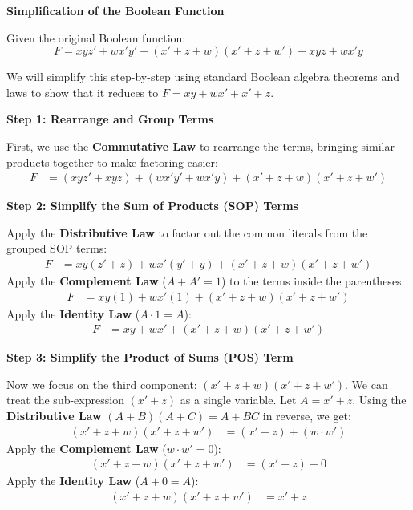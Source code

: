 \documentclass[12pt,a3paper]{article}
\begin{document}
\begin{enumerate}
\begin{tcolorbox}[enhanced,breakable,ansbox,colback=cA!4,colframe=cA,boxrule=0.8pt,arc=5pt,title={\textbf{Answer}},fonttitle=\bfseries\color{white},colbacktitle=cA]
\textbf{Simplification of the Boolean Function}

Given the original Boolean function:
\[ F = xyz' + wx'y' + (x'+z+w)(x'+z+w') + xyz + wx'y \]

We will simplify this step-by-step using standard Boolean algebra theorems and laws to show that it reduces to $F = xy + wx' + x' + z$.

\vspace{0.5cm}
\textbf{Step 1: Rearrange and Group Terms}

First, we use the \textbf{Commutative Law} to rearrange the terms, bringing similar products together to make factoring easier:
\begin{align*}
F &= (xyz' + xyz) + (wx'y' + wx'y) + (x'+z+w)(x'+z+w')
\end{align*}

\vspace{0.3cm}
\textbf{Step 2: Simplify the Sum of Products (SOP) Terms}

Apply the \textbf{Distributive Law} to factor out the common literals from the grouped SOP terms:
\begin{align*}
F &= xy(z' + z) + wx'(y' + y) + (x'+z+w)(x'+z+w')
\end{align*}
Apply the \textbf{Complement Law} ($A + A' = 1$) to the terms inside the parentheses:
\begin{align*}
F &= xy(1) + wx'(1) + (x'+z+w)(x'+z+w')
\end{align*}
Apply the \textbf{Identity Law} ($A \cdot 1 = A$):
\begin{align*}
F &= xy + wx' + (x'+z+w)(x'+z+w')
\end{align*}

\vspace{0.3cm}
\textbf{Step 3: Simplify the Product of Sums (POS) Term}

Now we focus on the third component: $(x'+z+w)(x'+z+w')$. 
We can treat the sub-expression $(x'+z)$ as a single variable. Let $A = x'+z$. 
Using the \textbf{Distributive Law} $(A+B)(A+C) = A + BC$ in reverse, we get:
\begin{align*}
(x'+z+w)(x'+z+w') &= (x'+z) + (w \cdot w')
\end{align*}
Apply the \textbf{Complement Law} ($w \cdot w' = 0$):
\begin{align*}
(x'+z+w)(x'+z+w') &= (x'+z) + 0
\end{align*}
Apply the \textbf{Identity Law} ($A + 0 = A$):
\begin{align*}
(x'+z+w)(x'+z+w') &= x' + z
\end{align*}


\end{tcolorbox}
\end{enumerate}
\end{document}
